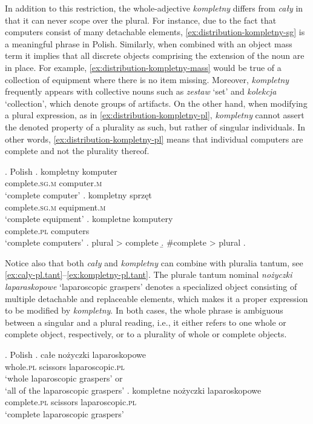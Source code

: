 In addition to this restriction, the whole-adjective \textit{kompletny} differs from \textit{cały} in that it can never scope over the plural. For instance, due to the fact that computers consist of many detachable elements, \ref{ex:distribution-kompletny-sg} is a meaningful phrase in Polish. Similarly, when combined with an object mass term it implies that all discrete objects comprising the extension of the noun are in place. For example, \ref{ex:distribution-kompletny-mass} would be true of a collection of equipment where there is no item missing. Moreover, \textit{kompletny} frequently appears with collective nouns such as \textit{zestaw} `set' and \textit{kolekcja} `collection', which denote groups of artifacts. On the other hand, when modifying a plural expression, as in \ref{ex:distribution-kompletny-pl}, \textit{kompletny} cannot assert the denoted property of a plurality as such, but rather of singular individuals. In other words, \ref{ex:distribution-kompletny-pl} means that individual computers are complete and not the plurality thereof.

		\ex. Polish\label{ex:distribution-kompletny}
        \ag. kompletny komputer\label{ex:distribution-kompletny-sg}\\
		complete\textsc{.sg.m} computer\textsc{.m}\\
		`complete computer'
        \bg. kompletny sprzęt\label{ex:distribution-kompletny-mass}\\
		complete\textsc{.sg.m} equipment\textsc{.m}\\
        `complete equipment'
		\bg. kompletne komputery\label{ex:distribution-kompletny-pl}\\
		complete\textsc{.pl} computers\\
		`complete computers'
        \a. plural > complete
        \b. \#complete > plural
        \z.

Notice also that both \textit{cały} and \textit{kompletny} can combine with pluralia tantum, see \ref{ex:caly-pl.tant}--\ref{ex:kompletny-pl.tant}. The plurale tantum nominal \textit{nożyczki laparaskopowe} `laparoscopic graspers' denotes a specialized object consisting of multiple detachable and replaceable elements, which makes it a proper expression to be modified by \textit{kompletny}. In both cases, the whole phrase is ambiguous between a singular and a plural reading, i.e., it either refers to one whole or complete object, respectively, or to a plurality of whole or complete objects. 

\ex. Polish\label{ex:calykompletny-pl.tant}
\ag. całe nożyczki laparoskopowe\label{ex:caly-pl.tant}\\
whole\textsc{.pl} scissors laparoscopic\textsc{.pl}\\
`whole laparoscopic graspers' or\\
`all of the laparoscopic graspers'
\bg. kompletne nożyczki laparoskopowe\label{ex:kompletny-pl.tant}\\
complete\textsc{.pl} scissors laparoscopic\textsc{.pl}\\
`complete laparoscopic graspers'

